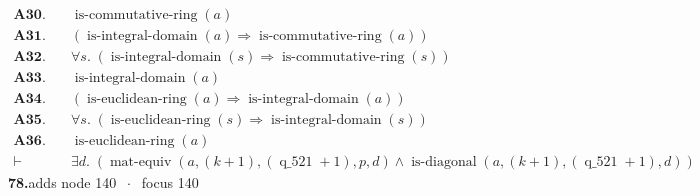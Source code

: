 \documentclass[11pt]{article}
\theoremstyle{plain}
\newcommand{\fit}[1]{\resizebox{\ifdim\width>\linewidth\linewidth\else\width\fi}{!}{#1}}
\begin{document}
\begin{align*}
  \mathbf{A30.}\quad & \operatorname{is\text{-}commutative\text{-}ring}(a) \\
  \mathbf{A31.}\quad & (\operatorname{is\text{-}integral\text{-}domain}(a) \Rightarrow \operatorname{is\text{-}commutative\text{-}ring}(a)) \\
  \mathbf{A32.}\quad & \forall s.\; (\operatorname{is\text{-}integral\text{-}domain}(s) \Rightarrow \operatorname{is\text{-}commutative\text{-}ring}(s)) \\
  \mathbf{A33.}\quad & \operatorname{is\text{-}integral\text{-}domain}(a) \\
  \mathbf{A34.}\quad & (\operatorname{is\text{-}euclidean\text{-}ring}(a) \Rightarrow \operatorname{is\text{-}integral\text{-}domain}(a)) \\
  \mathbf{A35.}\quad & \forall s.\; (\operatorname{is\text{-}euclidean\text{-}ring}(s) \Rightarrow \operatorname{is\text{-}integral\text{-}domain}(s)) \\
  \mathbf{A36.}\quad & \operatorname{is\text{-}euclidean\text{-}ring}(a) \\
  \vdash\quad & \exists d.\; (\operatorname{mat\text{-}equiv}(a, (k + 1), (\operatorname{q\_521} + 1), p, d) \wedge \operatorname{is\text{-}diagonal}(a, (k + 1), (\operatorname{q\_521} + 1), d))
\end{align*}
\medskip\noindent\textbf{78.}\quad \fit{\texttt{(ai 1)}}\hfill{\small adds node 140 $\;\cdot\;$ focus 140}\\[2pt]
\end{document}
